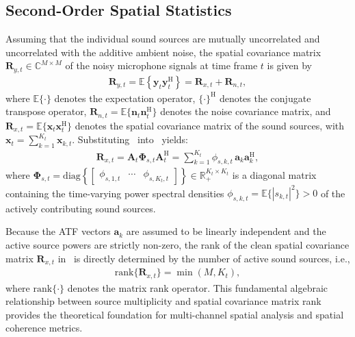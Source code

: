 \documentclass[lettersize,journal]{IEEEtran}
\begin{document}
\subsection{Second-Order Spatial Statistics}
\label{sec:second_order_statistics}
Assuming that the individual sound sources are mutually uncorrelated and uncorrelated with the additive ambient noise, the spatial covariance matrix $\mathbf{R}_{y,t} \in \mathbb{C}^{M\times M}$ of the noisy microphone signals at time frame $t$ is given by
\begin{align}
  \mathbf{R}_{y,t} = \mathbb{E}\left\{ \mathbf{y}_t \mathbf{y}_t^{\mathrm{H}} \right\} = \mathbf{R}_{x,t} + \mathbf{R}_{n,t},
  \label{eq:cov_model}
\end{align}
where $\mathbb{E}\{\cdot\}$ denotes the expectation operator, $\{\cdot\}^{\mathrm{H}}$ denotes the conjugate transpose operator, $\mathbf{R}_{n,t} = \mathbb{E}\{\mathbf{n}_t \mathbf{n}_t^{\mathrm{H}}\}$ denotes the noise covariance matrix, and $\mathbf{R}_{x,t} = \mathbb{E}\{\mathbf{x}_t \mathbf{x}_t^{\mathrm{H}}\}$ denotes the spatial covariance matrix of the sound sources, with $\mathbf{x}_t = \sum_{k=1}^{K_t}\mathbf{x}_{k,t}$. Substituting~ into~ yields:
\begin{align}
  \mathbf{R}_{x,t} = \mathbf{A}_t \bm{\Phi}_{s,t} \mathbf{A}_t^{\mathrm{H}} = \sum_{k=1}^{K_t} \phi_{s,k,t} \, \mathbf{a}_k \mathbf{a}_k^{\mathrm{H}},
  \label{eq:clean_cov_model}
\end{align}
where $\bm{\Phi}_{s,t} = \mathrm{diag}\left\{ \begin{bmatrix} \phi_{s,1,t} & \cdots & \phi_{s,K_t,t} \end{bmatrix} \right\} \in \mathbb{R}_{+}^{K_t \times K_t}$ is a diagonal matrix containing the time-varying power spectral densities $\phi_{s,k,t} = \mathbb{E}\{|s_{k,t}|^2\} > 0$ of the actively contributing sound sources.

Because the \gls{ATF} vectors $\mathbf{a}_k$ are assumed to be linearly independent and the active source powers are strictly non-zero, the rank of the clean spatial covariance matrix $\mathbf{R}_{x,t}$ in~ is directly determined by the number of active sound sources, i.e.,
\begin{align}
  \mathrm{rank}\{\mathbf{R}_{x,t}\} = \min(M, K_t),
  \label{eq:rank_relation}
\end{align}
where $\mathrm{rank}\{\cdot\}$ denotes the matrix rank operator.
This fundamental algebraic relationship between source multiplicity and spatial covariance matrix rank provides the theoretical foundation for multi-channel spatial analysis and spatial coherence metrics.
\end{document}
